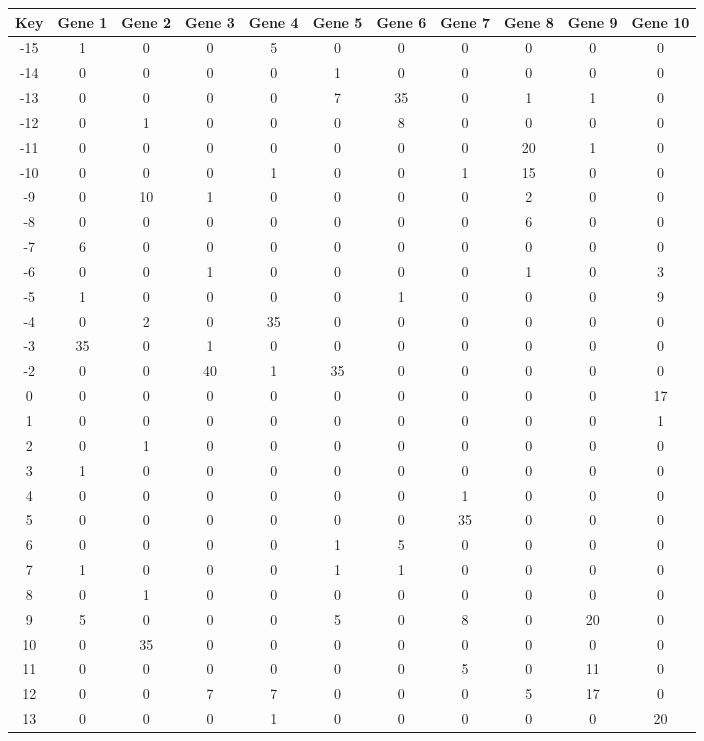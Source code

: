 \begin{tabular}{|c|c|c|c|c|c|c|c|c|c|c|}
\hline
Key & Gene 1 & Gene 2 & Gene 3 & Gene 4 & Gene 5 & Gene 6 & Gene 7 & Gene 8 & Gene 9 & Gene 10 \\
\hline
-15 & 1 & 0 & 0 & 5 & 0 & 0 & 0 & 0 & 0 & 0 \\
-14 & 0 & 0 & 0 & 0 & 1 & 0 & 0 & 0 & 0 & 0 \\
-13 & 0 & 0 & 0 & 0 & 7 & 35 & 0 & 1 & 1 & 0 \\
-12 & 0 & 1 & 0 & 0 & 0 & 8 & 0 & 0 & 0 & 0 \\
-11 & 0 & 0 & 0 & 0 & 0 & 0 & 0 & 20 & 1 & 0 \\
-10 & 0 & 0 & 0 & 1 & 0 & 0 & 1 & 15 & 0 & 0 \\
-9 & 0 & 10 & 1 & 0 & 0 & 0 & 0 & 2 & 0 & 0 \\
-8 & 0 & 0 & 0 & 0 & 0 & 0 & 0 & 6 & 0 & 0 \\
-7 & 6 & 0 & 0 & 0 & 0 & 0 & 0 & 0 & 0 & 0 \\
-6 & 0 & 0 & 1 & 0 & 0 & 0 & 0 & 1 & 0 & 3 \\
-5 & 1 & 0 & 0 & 0 & 0 & 1 & 0 & 0 & 0 & 9 \\
-4 & 0 & 2 & 0 & 35 & 0 & 0 & 0 & 0 & 0 & 0 \\
-3 & 35 & 0 & 1 & 0 & 0 & 0 & 0 & 0 & 0 & 0 \\
-2 & 0 & 0 & 40 & 1 & 35 & 0 & 0 & 0 & 0 & 0 \\
0 & 0 & 0 & 0 & 0 & 0 & 0 & 0 & 0 & 0 & 17 \\
1 & 0 & 0 & 0 & 0 & 0 & 0 & 0 & 0 & 0 & 1 \\
2 & 0 & 1 & 0 & 0 & 0 & 0 & 0 & 0 & 0 & 0 \\
3 & 1 & 0 & 0 & 0 & 0 & 0 & 0 & 0 & 0 & 0 \\
4 & 0 & 0 & 0 & 0 & 0 & 0 & 1 & 0 & 0 & 0 \\
5 & 0 & 0 & 0 & 0 & 0 & 0 & 35 & 0 & 0 & 0 \\
6 & 0 & 0 & 0 & 0 & 1 & 5 & 0 & 0 & 0 & 0 \\
7 & 1 & 0 & 0 & 0 & 1 & 1 & 0 & 0 & 0 & 0 \\
8 & 0 & 1 & 0 & 0 & 0 & 0 & 0 & 0 & 0 & 0 \\
9 & 5 & 0 & 0 & 0 & 5 & 0 & 8 & 0 & 20 & 0 \\
10 & 0 & 35 & 0 & 0 & 0 & 0 & 0 & 0 & 0 & 0 \\
11 & 0 & 0 & 0 & 0 & 0 & 0 & 5 & 0 & 11 & 0 \\
12 & 0 & 0 & 7 & 7 & 0 & 0 & 0 & 5 & 17 & 0 \\
13 & 0 & 0 & 0 & 1 & 0 & 0 & 0 & 0 & 0 & 20 \\
\hline
\end{tabular}